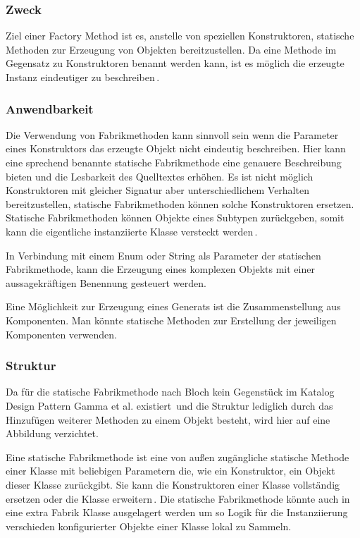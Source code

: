 \documentclass[12pt,oneside,a4paper,parskip]{scrbook}
\begin{document}
\subsubsection{Zweck}

Ziel einer Factory Method ist es, anstelle von speziellen Konstruktoren,  statische Methoden zur Erzeugung von Objekten bereitzustellen. Da eine Methode im Gegensatz zu Konstruktoren benannt werden kann, ist es möglich die erzeugte Instanz eindeutiger zu beschreiben\,\cite[S. 5f]{bloch2017}. 

\subsubsection{Anwendbarkeit}

Die Verwendung von Fabrikmethoden kann sinnvoll sein wenn die Parameter eines Konstruktors das erzeugte Objekt nicht eindeutig beschreiben. Hier kann eine sprechend benannte statische Fabrikmethode eine genauere Beschreibung bieten und die Lesbarkeit des Quelltextes erhöhen. Es ist nicht möglich Konstruktoren mit gleicher Signatur aber unterschiedlichem Verhalten bereitzustellen, statische Fabrikmethoden können solche Konstruktoren ersetzen. Statische Fabrikmethoden können Objekte eines Subtypen zurückgeben, somit kann die eigentliche instanziierte Klasse versteckt werden\,\cite[S. 5ff]{bloch2017}.

In Verbindung mit einem Enum oder String als Parameter der statischen Fabrikmethode, kann die Erzeugung eines komplexen Objekts mit einer aussagekräftigen Benennung gesteuert werden.

Eine Möglichkeit zur Erzeugung eines Generats ist die Zusammenstellung aus Komponenten. Man könnte statische Methoden zur Erstellung der jeweiligen Komponenten verwenden.

\subsubsection{Struktur}

Da für die statische Fabrikmethode nach Bloch kein Gegenstück im Katalog Design Pattern Gamma et al. existiert\,\cite[S. 5]{bloch2017} und die Struktur lediglich durch das Hinzufügen weiterer Methoden zu einem Objekt besteht, wird hier auf eine Abbildung verzichtet. 

Eine statische Fabrikmethode ist eine von außen zugängliche statische Methode einer Klasse mit beliebigen Parametern die, wie ein Konstruktor, ein Objekt dieser Klasse zurückgibt. Sie kann die Konstruktoren einer Klasse vollständig ersetzen oder die Klasse erweitern\,\cite[S. 5f]{bloch2017}. Die statische Fabrikmethode könnte auch in eine extra Fabrik Klasse ausgelagert werden um so Logik für die Instanziierung verschieden konfigurierter Objekte einer Klasse lokal zu Sammeln.
\end{document}
